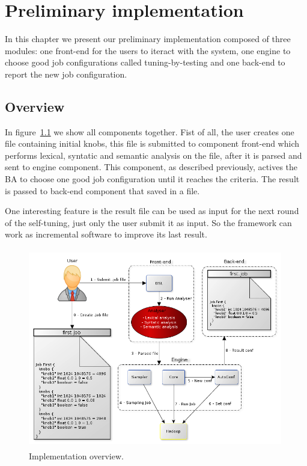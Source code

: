 \chapter{Preliminary implementation} %
\label{cha:framework}

In this chapter we present our preliminary implementation composed of three
modules: one front-end for the users to iteract with the system, one engine to
choose good job configurations called tuning-by-testing and one back-end to
report the new job configuration.

\section{Overview}

In figure~\ref{fig:overview} we show all components together. Fist of all, the
user creates one file containing initial knobs, this file is submitted to component
front-end which performs lexical, syntatic and semantic analysis on the file, after
it is parsed and sent to engine component. This component, as described previously,
actives the BA to choose one good job configuration until it reaches the criteria. The
result is passed to back-end component that saved in a file.

One interesting feature is the result file can be used as input for the next round
of the self-tuning, just only the user submit it as input. So the framework can work
as incremental software to improve its last result.

\begin{figure}[htbp]
	\centering
	\includegraphics[width=420px,height=330px]{img/overview.png}
	\caption{Implementation overview.}\label{fig:overview}
\end{figure}


